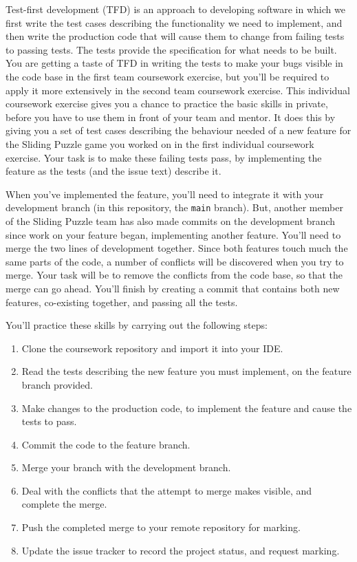 \documentclass[
]{book}
\providecommand{\tightlist}{%
  \setlength{\itemsep}{0pt}\setlength{\parskip}{0pt}}
\begin{document}
Test-first development (TFD) is an approach to developing software in which we first write the test cases describing the functionality we need to implement, and then write the production code that will cause them to change from failing tests to passing tests. The tests provide the specification for what needs to be built. You are getting a taste of TFD in writing the tests to make your bugs visible in the code base in the first team coursework exercise, but you'll be required to apply it more extensively in the second team coursework exercise. This individual coursework exercise gives you a chance to practice the basic skills in private, before you have to use them in front of your team and mentor. It does this by giving you a set of test cases describing the behaviour needed of a new feature for the Sliding Puzzle game you worked on in the first individual coursework exercise. Your task is to make these failing tests pass, by implementing the feature as the tests (and the issue text) describe it.

When you've implemented the feature, you'll need to integrate it with your development branch (in this repository, the \texttt{main} branch). But, another member of the Sliding Puzzle team has also made commits on the development branch since work on your feature began, implementing another feature. You'll need to merge the two lines of development together. Since both features touch much the same parts of the code, a number of conflicts will be discovered when you try to merge. Your task will be to remove the conflicts from the code base, so that the merge can go ahead. You'll finish by creating a commit that contains both new features, co-existing together, and passing all the tests.

You'll practice these skills by carrying out the following steps:

\begin{enumerate}
\def\labelenumi{\arabic{enumi}.}
\tightlist
\item
  Clone the coursework repository and import it into your IDE.
\item
  Read the tests describing the new feature you must implement, on the feature branch provided.
\item
  Make changes to the production code, to implement the feature and cause the tests to pass.
\item
  Commit the code to the feature branch.
\item
  Merge your branch with the development branch.
\item
  Deal with the conflicts that the attempt to merge makes visible, and complete the merge.
\item
  Push the completed merge to your remote repository for marking.
\item
  Update the issue tracker to record the project status, and request marking.
\end{enumerate}
\end{document}

